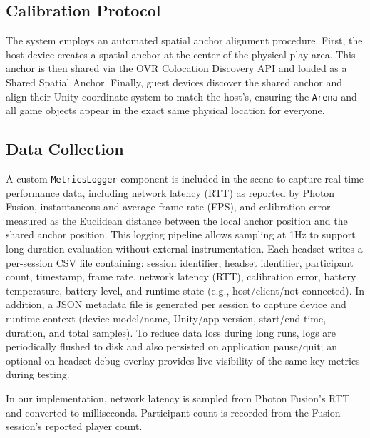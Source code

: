 \documentclass[conference]{IEEEtran}
\begin{document}
\subsection{Calibration Protocol}

The system employs an automated spatial anchor alignment procedure. First, the host device creates a spatial anchor at the center of the physical play area. This anchor is then shared via the OVR Colocation Discovery API\cite{MetaColocationDiscovery2025} and loaded as a Shared Spatial Anchor\cite{MetaSharedSpatialAnchors2025}. Finally, guest devices discover the shared anchor and align their Unity coordinate system to match the host's, ensuring the \texttt{Arena} and all game objects appear in the exact same physical location for everyone.

\subsection{Data Collection}
\label{sec:prototype-logging}
A custom \texttt{MetricsLogger} component is included in the scene to capture real-time performance data, including network latency (RTT) as reported by Photon Fusion\cite{PhotonFusionDocs}, instantaneous and average frame rate (FPS), and calibration error measured as the Euclidean distance between the local anchor position and the shared anchor position.
This logging pipeline allows sampling at 1Hz to support long-duration evaluation without external instrumentation. Each headset writes a per-session CSV file containing: session identifier, headset identifier, participant count, timestamp, frame rate, network latency (RTT), calibration error, battery temperature, battery level, and runtime state (e.g., host/client/not connected). In addition, a JSON metadata file is generated per session to capture device and runtime context (device model/name, Unity/app version, start/end time, duration, and total samples). To reduce data loss during long runs, logs are periodically flushed to disk and also persisted on application pause/quit; an optional on-headset debug overlay provides live visibility of the same key metrics during testing.

In our implementation, network latency is sampled from Photon Fusion's RTT and converted to milliseconds\cite{PhotonFusionDocs}. Participant count is recorded from the Fusion session's reported player count.
\end{document}
